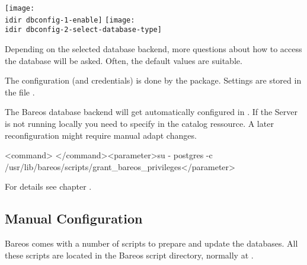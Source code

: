 \begin{center}
\texttt{[image: \\idir dbconfig-1-enable]}
\texttt{[image: \\idir dbconfig-2-select-database-type]}
\end{center}

Depending on the selected database backend,
more questions about how to access the database will be asked.
Often, the default values are suitable.

The  configuration (and credentials) is done by the  package.
Settings are stored in the file .

The Bareos database backend will get automatically configured in .
If the Server is not running locally you need to specify  in the catalog ressource.
A later reconfiguration might require manual adapt changes.

\begin{commands}{}
<command> </command><parameter>su - postgres -c /usr/lib/bareos/scripts/grant_bareos_privileges</parameter>
\end{commands}
For details see chapter .



\subsection{Manual Configuration}
    \label{CatMaintenanceManualConfiguration}

Bareos comes with a number of scripts to prepare and update the databases. All these scripts are located in the Bareos script directory, normally at \scriptPathUnix.

